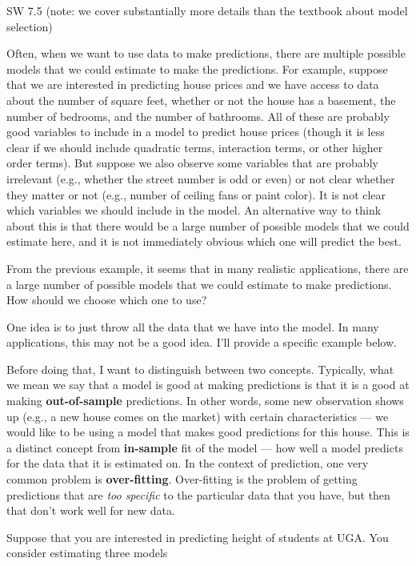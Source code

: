 \documentclass[
  letterpaper,
  DIV=11,
  numbers=noendperiod]{scrreprt}
\begin{document}
SW 7.5 (note: we cover substantially more details than the textbook
about model selection)

Often, when we want to use data to make predictions, there are multiple
possible models that we could estimate to make the predictions. For
example, suppose that we are interested in predicting house prices and
we have access to data about the number of square feet, whether or not
the house has a basement, the number of bedrooms, and the number of
bathrooms. All of these are probably good variables to include in a
model to predict house prices (though it is less clear if we should
include quadratic terms, interaction terms, or other higher order
terms). But suppose we also observe some variables that are probably
irrelevant (e.g., whether the street number is odd or even) or not clear
whether they matter or not (e.g., number of ceiling fans or paint
color). It is not clear which variables we should include in the model.
An alternative way to think about this is that there would be a large
number of possible models that we could estimate here, and it is not
immediately obvious which one will predict the best.

From the previous example, it seems that in many realistic applications,
there are a large number of possible models that we could estimate to
make predictions. How should we choose which one to use?

One idea is to just throw all the data that we have into the model. In
many applications, this may not be a good idea. I'll provide a specific
example below.

Before doing that, I want to distinguish between two concepts.
Typically, what we mean we say that a model is good at making
predictions is that it is a good at making \textbf{out-of-sample}
predictions. In other words, some new observation shows up (e.g., a new
house comes on the market) with certain characteristics --- we would
like to be using a model that makes good predictions for this house.
This is a distinct concept from \textbf{in-sample} fit of the model ---
how well a model predicts for the data that it is estimated on. In the
context of prediction, one very common problem is \textbf{over-fitting}.
Over-fitting is the problem of getting predictions that are \emph{too
specific} to the particular data that you have, but then that don't work
well for new data.

Suppose that you are interested in predicting height of students at UGA.
You consider estimating three models
\end{document}
